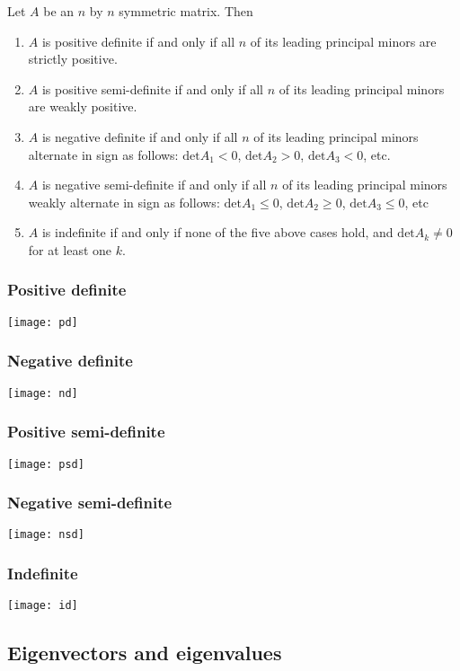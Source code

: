 \documentclass[compress]{beamer}
\renewcommand{\det}{\mathrm{det}}
\begin{document}
\begin{frame}
  \begin{theorem}
    Let $A$ be an $n$ by $n$ symmetric matrix. Then 
    \begin{enumerate}
    \item $A$ is positive definite if and only if all $n$ of its leading
      principal minors are strictly positive.
    \item $A$ is positive semi-definite if and only if all $n$ of its leading
      principal minors are weakly positive.
    \item $A$ is negative definite if and only if all $n$ of its leading
      principal minors alternate in sign as follows: $\det A_1 < 0$,
      $\det A_2 > 0$, $\det A_3 < 0$, etc.
    \item $A$ is negative semi-definite if and only if all $n$ of its
      leading principal minors weakly alternate in sign as follows:
      $\det A_1 \leq 0$, $\det A_2 \geq 0$, $\det A_3 \leq 0$, etc
    \item $A$ is indefinite if and only if none of the five above cases
      hold, and $\det A_k \neq 0$ for at least one $k$.
    \end{enumerate}
  \end{theorem}
\end{frame}

\begin{frame}\frametitle{Positive definite}
  \texttt{[image: pd]} 
\end{frame}

\begin{frame}\frametitle{Negative definite}
  \texttt{[image: nd]} 
\end{frame}

\begin{frame}\frametitle{Positive semi-definite}
  \texttt{[image: psd]} 
\end{frame}

\begin{frame}\frametitle{Negative semi-definite}
  \texttt{[image: nsd]} 
\end{frame}

\begin{frame}\frametitle{Indefinite}
  \texttt{[image: id]} 
\end{frame}

\subsection{Eigenvectors and eigenvalues}
\end{document}
